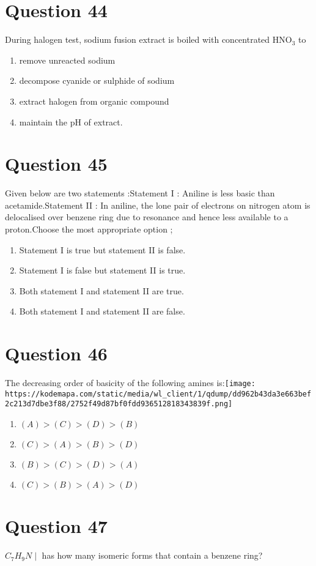 \documentclass{article}
\begin{document}
\section*{Question 44}
During halogen test, sodium fusion extract is boiled with concentrated \(\mathrm{HNO}_3\) to 
\begin{enumerate}[label=(\alph*)]
\item remove unreacted sodium
\item decompose cyanide or sulphide of sodium
\item extract halogen from organic compound
\item maintain the \(\mathrm{pH}\) of extract.
\end{enumerate}
\newpage
\section*{Question 45}
Given below are two statements :Statement I : Aniline is less basic than acetamide.Statement II : In aniline, the lone pair of electrons on nitrogen atom is delocalised over benzene ring due to resonance and hence less available to a proton.Choose the most appropriate option ; 
\begin{enumerate}[label=(\alph*)]
\item Statement I is true but statement II is false.
\item Statement I is false but statement II is true.
\item Both statement I and statement II are true.
\item Both statement I and statement II are false.
\end{enumerate}
\newpage
\section*{Question 46}
The decreasing order of basicity of the following amines is:\texttt{[image: https://kodemapa.com/static/media/wl\_client/1/qdump/dd962b43da3e663bef2c213d7dbe3f88/2752f49d87bf0fdd936512818343839f.png]}\newline
\begin{enumerate}[label=(\alph*)]
\item \((A)>(C)>(D)>(B)\)
\item \((C)>(A)>(B)>(D)\)
\item \((B)>(C)>(D)>(A)\)
\item \((C)>(B)>(A)>(D)\)
\end{enumerate}
\newpage
\section*{Question 47}
\(C_7 H_9 N \mid\) has how many isomeric forms that contain a benzene ring? 
\begin{enumerate}[label=(\alph*)]
\end{enumerate}
\newpage
\end{document}
